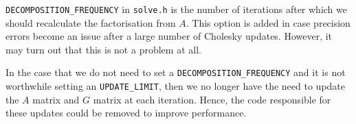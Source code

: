 \documentclass[11pt]{article}
\begin{document}
\texttt{DECOMPOSITION_FREQUENCY} in \texttt{solve.h} is the number of iterations after which we should recalculate the factorisation from $A$. This option is added in case precision errors become an issue after a large number of Cholesky updates. However, it may turn out that this is not a problem at all.

In the case that we do not need to set a \texttt{DECOMPOSITION_FREQUENCY} and it is not worthwhile setting an \texttt{UPDATE_LIMIT}, then we no longer have the need to update the $A$ matrix and $G$ matrix at each iteration. Hence, the code responsible for these updates could be removed to improve performance.

\newpage


\end{document}
